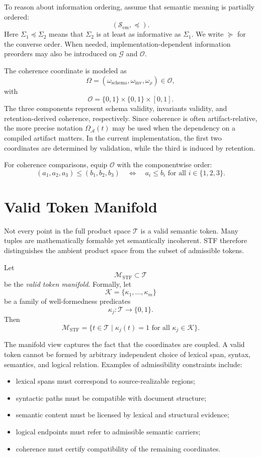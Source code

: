 \documentclass{article}
\newcommand{\STF}{{\normalfont\textsc{STF}}}
\newcommand{\Sem}{\mathcal{S}_{\mathrm{em}}}
\newcommand{\Rel}{\mathcal{G}}
\newcommand{\Coh}{\mathcal{O}}
\newcommand{\TokSpace}{\mathcal{T}}
\newcommand{\Manifold}{\mathcal{M}_{\mathrm{STF}}}
\begin{document}
To reason about information ordering, assume that semantic meaning is partially ordered:
\[
(\Sem, \preceq).
\]
Here \(\Sigma_1 \preceq \Sigma_2\) means that \(\Sigma_2\) is at least as informative as \(\Sigma_1\). We write \(\succeq\) for the converse order. When needed, implementation-dependent information preorders may also be introduced on \(\Rel\) and \(\Coh\).

The coherence coordinate is modeled as
\[
\Omega = (\omega_{\mathrm{schema}}, \omega_{\mathrm{inv}}, \omega_{\rho}) \in \Coh,
\]
with
\[
\Coh = \{0,1\} \times \{0,1\} \times [0,1].
\]
The three components represent schema validity, invariants validity, and retention-derived coherence, respectively. Since coherence is often artifact-relative, the more precise notation \(\Omega_{\mathcal{A}}(t)\) may be used when the dependency on a compiled artifact matters. In the current implementation, the first two coordinates are determined by validation, while the third is induced by retention.

For coherence comparisons, equip \(\Coh\) with the componentwise order:
\[
(a_1,a_2,a_3) \le (b_1,b_2,b_3)
\quad \Longleftrightarrow \quad
a_i \le b_i \text{ for all } i \in \{1,2,3\}.
\]

\section{Valid Token Manifold}

Not every point in the full product space \(\TokSpace\) is a valid semantic token. Many tuples are mathematically formable yet semantically incoherent. \STF{} therefore distinguishes the ambient product space from the subset of admissible tokens.

Let
\[
\Manifold \subset \TokSpace
\]
be the \emph{valid token manifold}. Formally, let
\[
\mathcal{K} = \{\kappa_1, \dots, \kappa_m\}
\]
be a family of well-formedness predicates
\[
\kappa_j : \TokSpace \to \{0,1\}.
\]
Then
\[
\Manifold = \{t \in \TokSpace \mid \kappa_j(t)=1 \text{ for all } \kappa_j \in \mathcal{K}\}.
\]

The manifold view captures the fact that the coordinates are coupled. A valid token cannot be formed by arbitrary independent choice of lexical span, syntax, semantics, and logical relation. Examples of admissibility constraints include:
\begin{itemize}
\item lexical spans must correspond to source-realizable regions;
\item syntactic paths must be compatible with document structure;
\item semantic content must be licensed by lexical and structural evidence;
\item logical endpoints must refer to admissible semantic carriers;
\item coherence must certify compatibility of the remaining coordinates.
\end{itemize}
\end{document}
